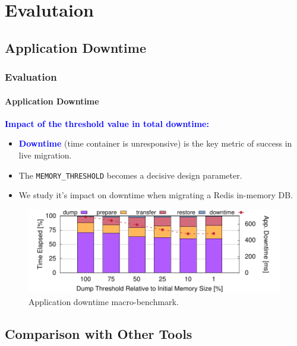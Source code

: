 \documentclass[9pt,    %
    english,            %
    xcolor=table,       %
    envcountsect,        %
    aspectratio=169     %
]{beamer}
\begin{document}
\section{Evalutaion}

\subsection{Application Downtime}

\begin{frame}
    \frametitle{Evaluation}
    \framesubtitle{Application Downtime}

    \vspace{10pt}

    \textbf{\textcolor{blue}{Impact of the threshold value in total downtime:}}
    \begin{itemize}
        \item \textcolor{blue}{\textbf{Downtime}} (time container is unresponsive) is the key metric of success in live migration.
        \item The \texttt{MEMORY\_THRESHOLD} becomes a decisive design parameter.
        \item We study it's impact on downtime when migrating a Redis in-memory DB.
    \end{itemize}

    \vspace{-5pt}

    \begin{figure}
        \centering
        \includegraphics[width=.75\textwidth]{./figs/downtime.pdf}
        \caption{Application downtime macro-benchmark.\label{fig:diskless-microbecnhmark}}
    \end{figure}
    
\end{frame}

\subsection{Comparison with Other Tools}
\end{document}
